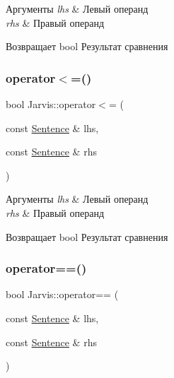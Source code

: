 \begin{DoxyParams}{Аргументы}
{\em lhs} & Левый операнд \\
\hline
{\em rhs} & Правый операнд \\
\hline
\end{DoxyParams}
\begin{DoxyReturn}{Возвращает}
bool Результат сравнения 
\end{DoxyReturn}
\mbox{\label{namespaceJarvis_a0df10f752b2586fd4069ef999f744c04}} 
\subsubsection{\texorpdfstring{operator$<$=()}{operator<=()}}
{\footnotesize\ttfamily bool Jarvis\+::operator$<$= (\begin{DoxyParamCaption}\item[{const \hyperlink{classJarvis_1_1Sentence}{Sentence} \&}]{lhs,  }\item[{const \hyperlink{classJarvis_1_1Sentence}{Sentence} \&}]{rhs }\end{DoxyParamCaption})}


\begin{DoxyParams}{Аргументы}
{\em lhs} & Левый операнд \\
\hline
{\em rhs} & Правый операнд \\
\hline
\end{DoxyParams}
\begin{DoxyReturn}{Возвращает}
bool Результат сравнения 
\end{DoxyReturn}
\mbox{\label{namespaceJarvis_a333da3058dd9eba2fb455fce8edd2557}} 
\subsubsection{\texorpdfstring{operator==()}{operator==()}}
{\footnotesize\ttfamily bool Jarvis\+::operator== (\begin{DoxyParamCaption}\item[{const \hyperlink{classJarvis_1_1Sentence}{Sentence} \&}]{lhs,  }\item[{const \hyperlink{classJarvis_1_1Sentence}{Sentence} \&}]{rhs }\end{DoxyParamCaption})}


